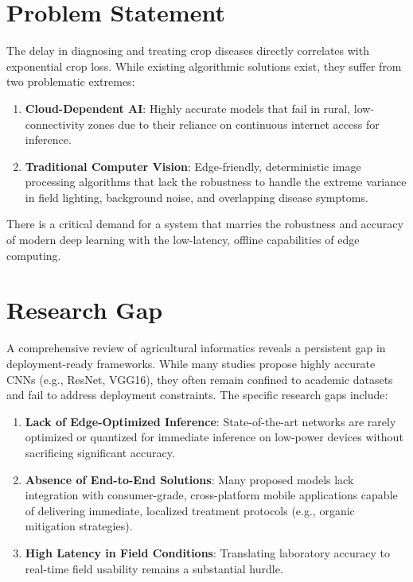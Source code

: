 \documentclass[conference]{IEEEtran}
\begin{document}
\section{Problem Statement}
The delay in diagnosing and treating crop diseases directly correlates with exponential crop loss. While existing algorithmic solutions exist, they suffer from two problematic extremes:
\begin{enumerate}
    \item \textbf{Cloud-Dependent AI}: Highly accurate models that fail in rural, low-connectivity zones due to their reliance on continuous internet access for inference.
    \item \textbf{Traditional Computer Vision}: Edge-friendly, deterministic image processing algorithms that lack the robustness to handle the extreme variance in field lighting, background noise, and overlapping disease symptoms.
\end{enumerate}

There is a critical demand for a system that marries the robustness and accuracy of modern deep learning with the low-latency, offline capabilities of edge computing.

\section{Research Gap}
A comprehensive review of agricultural informatics reveals a persistent gap in deployment-ready frameworks. While many studies propose highly accurate CNNs (e.g., ResNet, VGG16), they often remain confined to academic datasets and fail to address deployment constraints. The specific research gaps include:
\begin{enumerate}
    \item \textbf{Lack of Edge-Optimized Inference}: State-of-the-art networks are rarely optimized or quantized for immediate inference on low-power devices without sacrificing significant accuracy.
    \item \textbf{Absence of End-to-End Solutions}: Many proposed models lack integration with consumer-grade, cross-platform mobile applications capable of delivering immediate, localized treatment protocols (e.g., organic mitigation strategies).
    \item \textbf{High Latency in Field Conditions}: Translating laboratory accuracy to real-time field usability remains a substantial hurdle.
\end{enumerate}
\end{document}
